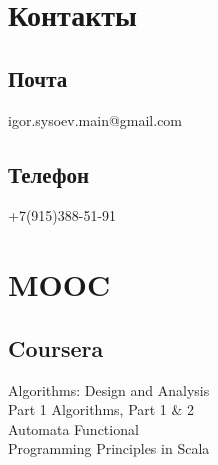 \documentclass[a4paper]{curricula-vitae}
\begin{document}



\begin{minipage}[t]{0.33\textwidth} %

\section{Контакты} 

\subsection{Почта}
igor.sysoev.main@gmail.com

\insertspace

\subsection{Телефон}
+7(915)388-51-91


\insertspace

\section{MOOC}

\subsection{Coursera}
Algorithms: Design and Analysis \\
Part 1 \textbullet{} Algorithms, Part 1 \& 2 \\ 
Automata \textbullet{} Functional \\
Programming Principles in Scala


\end{minipage}
\end{document}

